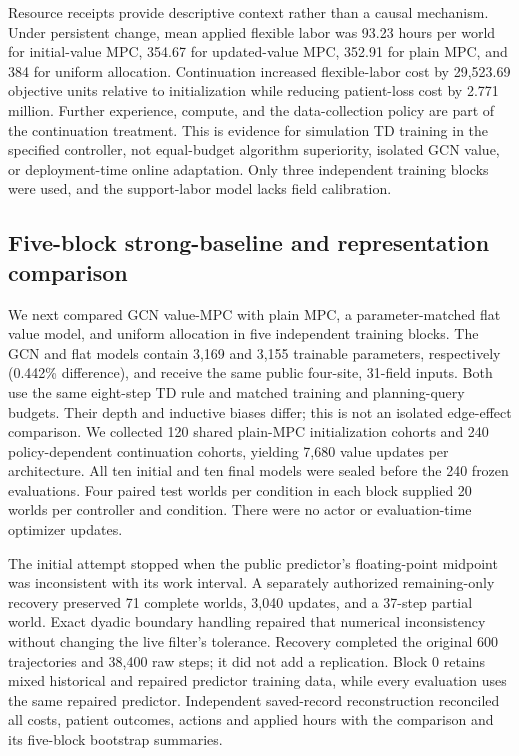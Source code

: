 \documentclass[preprint,review,12pt]{elsarticle}
\begin{document}
Resource receipts provide descriptive context rather than a causal mechanism.
Under persistent change, mean applied flexible labor was 93.23 hours per world
for initial-value MPC, 354.67 for updated-value MPC, 352.91 for plain MPC, and
384 for uniform allocation. Continuation increased flexible-labor cost by
29,523.69 objective units relative to initialization while reducing patient-loss
cost by 2.771 million. Further experience, compute, and the data-collection policy
are part of the continuation treatment. This is evidence for simulation TD
training in the specified controller, not equal-budget algorithm superiority,
isolated GCN value, or deployment-time online adaptation. Only three independent
training blocks were used, and the support-labor model lacks field calibration.

\subsection{Five-block strong-baseline and representation comparison}
\label{sec:value-mpc-strong-comparison}
We next compared GCN value-MPC with plain MPC, a parameter-matched flat value
model, and uniform allocation in five independent training blocks. The GCN
and flat models contain 3,169 and 3,155 trainable parameters, respectively
(0.442\% difference), and receive the same public four-site, 31-field inputs.
Both use the same eight-step TD rule and matched training and planning-query
budgets. Their depth and inductive biases differ; this is not an isolated
edge-effect comparison. We collected 120 shared plain-MPC initialization
cohorts and 240 policy-dependent continuation cohorts, yielding 7,680 value
updates per architecture. All ten initial and ten final models were sealed
before the 240 frozen evaluations. Four paired test worlds per condition in
each block supplied 20 worlds per controller and condition. There were no
actor or evaluation-time optimizer updates.

The initial attempt stopped when the public predictor's floating-point midpoint
was inconsistent with its work interval. A separately authorized remaining-only
recovery preserved 71 complete worlds, 3,040 updates, and a 37-step partial
world. Exact dyadic boundary handling repaired that numerical inconsistency
without changing the live filter's tolerance. Recovery completed the original
600 trajectories and 38,400 raw steps; it did not add a replication. Block 0
retains mixed historical and repaired predictor training data, while every
evaluation uses the same repaired predictor. Independent saved-record
reconstruction reconciled all costs, patient outcomes, actions and applied
hours with the comparison and its five-block bootstrap summaries.
\end{document}
